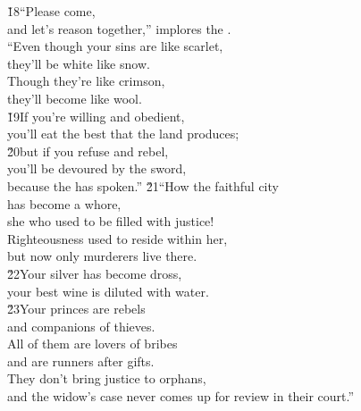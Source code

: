 \begin{poetry}
\poeml \v{18}``Please come, \\
\poemll    and let's reason together,'' implores the . \\
\poeml ``Even though your sins are like scarlet, \\
\poemll    they'll be white like snow. \\
\poeml Though they're like crimson, \\
\poemll    they'll become like wool. \\
\poeml \v{19}If you're willing and obedient, \\
\poemll    you'll eat the best that the land produces; \\
\poeml \v{20}but if you refuse and rebel, \\
\poemll    you'll be devoured by the sword, \\
\poemlll       because the  has spoken.''
\poeml \v{21}``How the faithful city \\
\poemll    has become a whore, \\
\poemlll       she who used to be filled with justice! \\
\poeml Righteousness used to reside within her, \\
\poemll    but now only murderers live there. \\
\poeml \v{22}Your silver has become dross, \\
\poemll    your best wine is diluted with water. \\
\poeml \v{23}Your princes are rebels \\
\poemll    and companions of thieves. \\
\poeml All of them are lovers of bribes \\
\poemll    and are runners after gifts. \\
\poeml They don't bring justice to orphans, \\
\poemll    and the widow's case never comes up for review in their court.''
\end{poetry}

